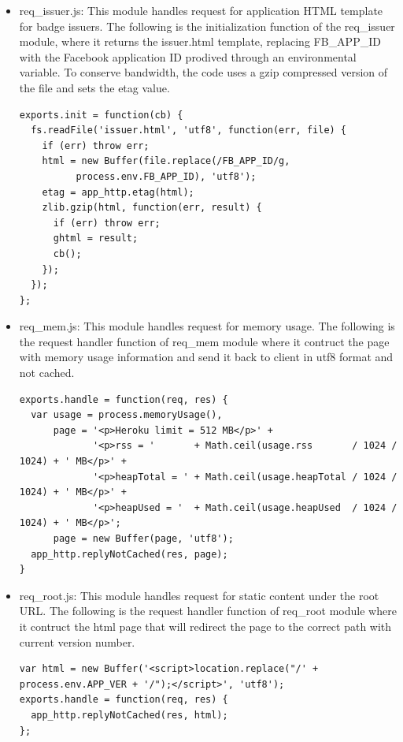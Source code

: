 \begin{itemize}
\item req{\_}issuer.js: This module handles request for application HTML template for badge issuers. The following is the initialization function of the req{\_}issuer module, where it returns the issuer.html template, replacing FB{\_}APP{\_}ID with the Facebook application ID prodived through an environmental variable.  To conserve bandwidth, the code uses a gzip compressed version of the file and sets the etag value.

\begin{lstlisting} 
exports.init = function(cb) {
  fs.readFile('issuer.html', 'utf8', function(err, file) {
    if (err) throw err;
    html = new Buffer(file.replace(/FB_APP_ID/g, 
          process.env.FB_APP_ID), 'utf8');
    etag = app_http.etag(html);
    zlib.gzip(html, function(err, result) {
      if (err) throw err;
      ghtml = result;
      cb();
    });
  });
};
\end{lstlisting} 

\item req{\_}mem.js: This module handles request for memory usage. The following is the request handler function of req{\_}mem module where it contruct the page with memory usage information and send it back to client in utf8 format and not cached. 

\begin{lstlisting}
exports.handle = function(req, res) {
  var usage = process.memoryUsage(),
      page = '<p>Heroku limit = 512 MB</p>' + 
             '<p>rss = '       + Math.ceil(usage.rss       / 1024 / 1024) + ' MB</p>' +  
             '<p>heapTotal = ' + Math.ceil(usage.heapTotal / 1024 / 1024) + ' MB</p>' +
             '<p>heapUsed = '  + Math.ceil(usage.heapUsed  / 1024 / 1024) + ' MB</p>';
      page = new Buffer(page, 'utf8');
  app_http.replyNotCached(res, page);
}
\end{lstlisting}

\item req{\_}root.js: This module handles request for static content under the root URL. The following is the request handler function of req{\_}root module where it contruct the html page that will redirect the page to the correct path with current version number.

\begin{lstlisting}
var html = new Buffer('<script>location.replace("/' + process.env.APP_VER + '/");</script>', 'utf8');
exports.handle = function(req, res) {
  app_http.replyNotCached(res, html);
};
\end{lstlisting}



\end{itemize}
